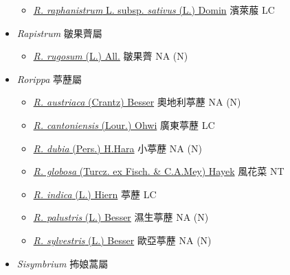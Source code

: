 \begin{itemize}
  \begin{itemize}
        \item[] \href{http://www.theplantlist.org/tpl1.1/search?q=Raphanus+raphanistrum+subsp.+sativus}{\textit{R. raphanistrum} L. subsp. \textit{sativus} (L.) Domin}   濱萊菔   LC
  \end{itemize}
 \item[] \textit{Rapistrum} 皺果薺屬
                                
  \begin{itemize}
        \item[] \href{http://www.theplantlist.org/tpl1.1/search?q=Rapistrum+rugosum}{\textit{R. rugosum} (L.) All.}   皺果薺   NA (N)
  \end{itemize}
 \item[] \textit{Rorippa} 葶藶屬
                                
  \begin{itemize}
        \item[] \href{http://www.theplantlist.org/tpl1.1/search?q=Rorippa+austriaca}{\textit{R. austriaca} (Crantz) Besser}   奧地利葶藶   NA (N)
        \item[] \href{http://www.theplantlist.org/tpl1.1/search?q=Rorippa+cantoniensis}{\textit{R. cantoniensis} (Lour.) Ohwi}   廣東葶藶   LC
        \item[] \href{http://www.theplantlist.org/tpl1.1/search?q=Rorippa+dubia}{\textit{R. dubia} (Pers.) H.Hara}   小葶藶   NA (N)
        \item[] \href{http://www.theplantlist.org/tpl1.1/search?q=Rorippa+globosa}{\textit{R. globosa} (Turcz. ex Fisch. \& C.A.Mey) Hayek}   風花菜   NT
        \item[] \href{http://www.theplantlist.org/tpl1.1/search?q=Rorippa+indica}{\textit{R. indica} (L.) Hiern}   葶藶   LC
        \item[] \href{http://www.theplantlist.org/tpl1.1/search?q=Rorippa+palustris}{\textit{R. palustris} (L.) Besser}   濕生葶藶   NA (N)
        \item[] \href{http://www.theplantlist.org/tpl1.1/search?q=Rorippa+sylvestris}{\textit{R. sylvestris} (L.) Besser}   歐亞葶藶   NA (N)
  \end{itemize}
 \item[] \textit{Sisymbrium} 抪娘蒿屬
                                

\end{itemize}
